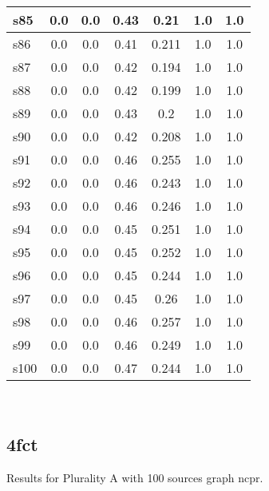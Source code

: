\documentclass{article}
\begin{document}
\begin{tabular}{|l|c|c|c|c|c|c|}
\hline
s85 &0.0 & 0.0 & 0.43 & 0.21 & 1.0 & 1.0\\
\hline
s86 &0.0 & 0.0 & 0.41 & 0.211 & 1.0 & 1.0\\
\hline
s87 &0.0 & 0.0 & 0.42 & 0.194 & 1.0 & 1.0\\
\hline
s88 &0.0 & 0.0 & 0.42 & 0.199 & 1.0 & 1.0\\
\hline
s89 &0.0 & 0.0 & 0.43 & 0.2 & 1.0 & 1.0\\
\hline
s90 &0.0 & 0.0 & 0.42 & 0.208 & 1.0 & 1.0\\
\hline
s91 &0.0 & 0.0 & 0.46 & 0.255 & 1.0 & 1.0\\
\hline
s92 &0.0 & 0.0 & 0.46 & 0.243 & 1.0 & 1.0\\
\hline
s93 &0.0 & 0.0 & 0.46 & 0.246 & 1.0 & 1.0\\
\hline
s94 &0.0 & 0.0 & 0.45 & 0.251 & 1.0 & 1.0\\
\hline
s95 &0.0 & 0.0 & 0.45 & 0.252 & 1.0 & 1.0\\
\hline
s96 &0.0 & 0.0 & 0.45 & 0.244 & 1.0 & 1.0\\
\hline
s97 &0.0 & 0.0 & 0.45 & 0.26 & 1.0 & 1.0\\
\hline
s98 &0.0 & 0.0 & 0.46 & 0.257 & 1.0 & 1.0\\
\hline
s99 &0.0 & 0.0 & 0.46 & 0.249 & 1.0 & 1.0\\
\hline
s100 &0.0 & 0.0 & 0.47 & 0.244 & 1.0 & 1.0\\
\hline
\end{tabular}\\

\newpage

\subsection{4fct}

\noindent Results for Plurality A with 100 sources graph ncpr.
\end{document}
